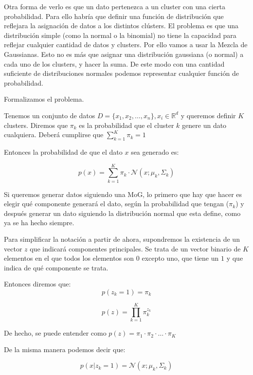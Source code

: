 \documentclass[a4paper,10pt]{article}
\begin{document}
Otra forma de verlo es que un dato pertenezca a un cluster con una cierta probabilidad. Para ello habría que definir una función de distribución que reflejara la asignación de datos a los distintos clústers. El problema es que una distribución simple (como la normal o la binomial) no tiene la capacidad para reflejar cualquier cantidad de datos y clusters. Por ello vamos a usar la Mezcla de Gaussianas. Esto no es más que asignar una distribución gaussiana (o normal) a cada uno de los clusters, y hacer la suma. De este modo con una cantidad suficiente de distribuciones normales podemos representar cualquier función de probabilidad.

Formalizamos el problema.

Tenemos un conjunto de datos $D = \{x_1, x_2, \dots, x_n\}, x_i \in \mathbb{R}^d$ y queremos definir $K$ clusters. Diremos que $\pi_k$ es la probabilidad que el cluster $k$ genere un dato cualquiera. Deberá cumplirse que $\sum_{k = 1}^K \pi_k = 1$

Entonces la probabilidad de que el dato $x$ sea generado es:

\begin{equation*}
p(x) = \sum_{k = 1}^{K} \pi_k \cdot \mathcal{N}(x; \mu_k, \Sigma_k)
\end{equation*}

Si queremos generar datos siguiendo una MoG, lo primero que hay que hacer es elegir qué componente generará el dato, según la probabilidad que tengan ($\pi_k$) y después generar un dato siguiendo la distribución normal que esta define, como ya se ha hecho siempre.

Para simplificar la notación a partir de ahora, supondremos la existencia de un vector $z$ que indicará componentes principales. Se trata de un vector binario de $K$ elementos en el que todos los elementos son $0$ excepto uno, que tiene un $1$ y que indica de qué componente se trata.

Entonces diremos que:
\begin{equation*}
p(z_k = 1) = \pi_k
\end{equation*}

\begin{equation*}
p(z) = \prod_{k = 1}^{K} \pi_k^{z_k}
\end{equation*}

De hecho, se puede entender como $p(z) = \pi_1 \cdot \pi_2 \cdot \dots \cdot \pi_K$

De la misma manera podemos decir que:

\begin{equation*}
p(x | z_k = 1) = \mathcal{N}(x; \mu_k, \Sigma_k)
\end{equation*}
\end{document}
